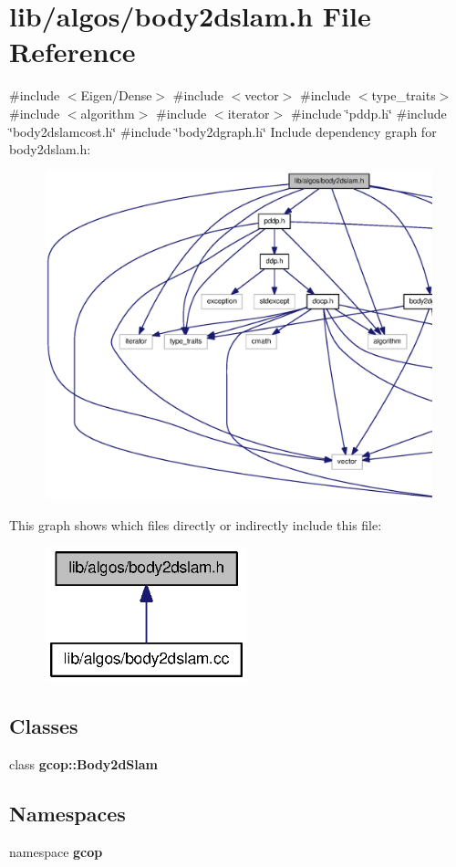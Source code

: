 \section{lib/algos/body2dslam.h \-File \-Reference}
\label{body2dslam_8h}
{\ttfamily \#include $<$\-Eigen/\-Dense$>$}\*
{\ttfamily \#include $<$vector$>$}\*
{\ttfamily \#include $<$type\-\_\-traits$>$}\*
{\ttfamily \#include $<$algorithm$>$}\*
{\ttfamily \#include $<$iterator$>$}\*
{\ttfamily \#include \char`\"{}pddp.\-h\char`\"{}}\*
{\ttfamily \#include \char`\"{}body2dslamcost.\-h\char`\"{}}\*
{\ttfamily \#include \char`\"{}body2dgraph.\-h\char`\"{}}\*
\-Include dependency graph for body2dslam.\-h\-:\nopagebreak
\begin{figure}[H]
\begin{center}
\leavevmode
\includegraphics[width=350pt]{body2dslam_8h__incl}
\end{center}
\end{figure}
\-This graph shows which files directly or indirectly include this file\-:\nopagebreak
\begin{figure}[H]
\begin{center}
\leavevmode
\includegraphics[width=166pt]{body2dslam_8h__dep__incl}
\end{center}
\end{figure}
\subsection*{\-Classes}
\begin{DoxyCompactItemize}
\item 
class {\bf gcop\-::\-Body2d\-Slam}
\end{DoxyCompactItemize}
\subsection*{\-Namespaces}
\begin{DoxyCompactItemize}
\item 
namespace {\bf gcop}
\end{DoxyCompactItemize}
